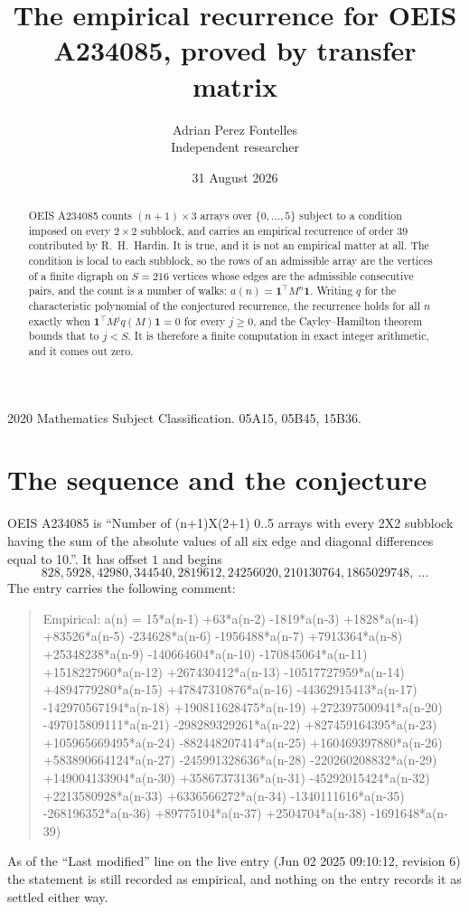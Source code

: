 \documentclass[11pt,a4paper]{article}
\title{The empirical recurrence for OEIS A234085, proved by transfer matrix}
\author{Adrian Perez Fontelles\\ \small Independent researcher}
\date{31 August 2026}
\theoremstyle{plain}
\theoremstyle{definition}
\begin{document}
\maketitle

\begin{abstract}
OEIS A234085 counts $(n+1)\times3$ arrays over $\{0,\dots,5\}$ subject to a condition imposed on
every $2\times2$ subblock, and carries an empirical recurrence of order $39$ contributed
by R.~H.~Hardin. It is true, and it is not an empirical matter at all. The condition is local
to each subblock, so the rows of an admissible array are the vertices of a finite digraph
on $S=216$ vertices whose edges are the admissible consecutive pairs, and the count is a
number of walks: $a(n)=\mathbf{1}^{\!\top}M^{n}\mathbf{1}$. Writing $q$
for the characteristic polynomial of the conjectured recurrence, the recurrence holds for all
$n$ exactly when $\mathbf{1}^{\!\top}M^{j}q(M)\mathbf{1}=0$ for every $j\ge0$, and the
Cayley--Hamilton theorem bounds that to $j<S$. It is therefore a finite computation in exact
integer arithmetic, and it comes out zero.
\end{abstract}

\noindent\small 2020 Mathematics Subject Classification. 05A15, 05B45, 15B36.\normalsize

\section{The sequence and the conjecture}

OEIS A234085 is ``Number of (n+1)X(2+1) 0..5 arrays with every 2X2 subblock having the sum of the absolute values of all six edge and diagonal differences equal to 10.''. It has offset $1$ and begins
\[
828, 5928, 42980, 344540, 2819612, 24256020, 210130764, 1865029748,\ \dots
\]
The entry carries the following comment:
\begin{quote}\small
Empirical: a(n) = 15*a(n-1) +63*a(n-2) -1819*a(n-3) +1828*a(n-4) +83526*a(n-5) -234628*a(n-6) -1956488*a(n-7) +7913364*a(n-8) +25348238*a(n-9) -140664604*a(n-10) -170845064*a(n-11) +1518227960*a(n-12) +267430412*a(n-13) -10517727959*a(n-14) +4894779280*a(n-15) +47847310876*a(n-16) -44362915413*a(n-17) -142970567194*a(n-18) +190811628475*a(n-19) +272397500941*a(n-20) -497015809111*a(n-21) -298289329261*a(n-22) +827459164395*a(n-23) +105965669495*a(n-24) -882448207414*a(n-25) +160469397880*a(n-26) +583890664124*a(n-27) -245991328636*a(n-28) -220260208832*a(n-29) +149004133904*a(n-30) +35867373136*a(n-31) -45292015424*a(n-32) +2213580928*a(n-33) +6336566272*a(n-34) -1340111616*a(n-35) -268196352*a(n-36) +89775104*a(n-37) +2504704*a(n-38) -1691648*a(n-39)
\end{quote}
As of the ``Last modified'' line on the live entry (Jun 02 2025 09:10:12, revision 6) the statement is
still recorded as empirical, and nothing on the entry records it as settled either way.
\end{document}
